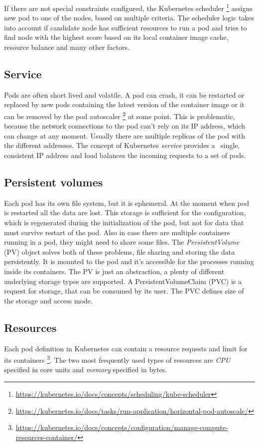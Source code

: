 \documentclass[
  digital, %
  twoside, %
  table,   %
  lof,     %
  lot,     %
]{fithesis3}
\begin{document}
If there are not special constraints configured, the Kubernetes scheduler \footnote{\url{https://kubernetes.io/docs/concepts/scheduling/kube-scheduler}} assigns new pod to one of the nodes, based on multiple criteria. The scheduler logic takes into account if candidate node has sufficient resources to run a pod and tries to find node with the highest score based on its local container image cache, resource balance and many other factors.

\subsection{Service} \label{sec:service}
Pods are often short lived and volatile. A pod can crash, it can be restarted or replaced by new pods containing the latest version of the container image or it can be removed by the pod autoscaler \footnote{\url{https://kubernetes.io/docs/tasks/run-application/horizontal-pod-autoscale/}} at some point. This is problematic, because the network connections to the pod can't rely on its IP address, which can change at any moment. Usually there are multiple replicas of the pod with the different addresses. The concept of Kubernetes \textit{service} provides a \
single, consistent IP address and load balances the incoming requests to a set of pods.

\subsection{Persistent volumes} \label{sec:pv}
Each pod has its own file system, but it is ephemeral. At the moment when pod is restarted all the data are lost. This storage is sufficient for the configuration, which is regenerated during the initialization of the pod, but not for data that must survive restart of the pod. Also in case there are multiple containers running in a pod, they might need to share some files. The \textit{PersistentVolume} (PV) object solves both of these problems, file sharing and storing the data persistently. It is mounted to the pod and it's accessible for the processes running inside its containers. The PV is just an abstraction, a plenty of different underlying storage types are supported. A PersistentVolumeClaim (PVC) is a request for storage, that can be consumed by its user. The PVC defines size of the storage and access mode.

\subsection{Resources} \label{sec:resources}
Each pod definition in Kubernetes can contain a resource requests and limit for its containers \footnote{\url{https://kubernetes.io/docs/concepts/configuration/manage-compute-resources-container/}}. The two most frequently used types of resources are \textit{CPU} specified in core units and \textit{memory} specified in bytes.
\end{document}
